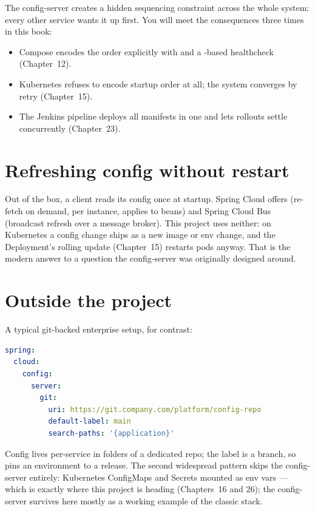 The config-server creates a hidden sequencing constraint across the whole
system: every other service wants it up first. You will meet the
consequences three times in this book:

\begin{itemize}
  \item Compose encodes the order explicitly with  and a
  -based healthcheck (Chapter~12).
  \item Kubernetes refuses to encode startup order at all; the system
  converges by retry (Chapter~15).
  \item The Jenkins pipeline deploys all manifests in one
   and lets rollouts settle concurrently
  (Chapter~23).
\end{itemize}

\section{Refreshing config without restart}

Out of the box, a client reads its config once at startup. Spring Cloud
offers  (re-fetch on demand, per instance,
applies to  beans) and Spring Cloud Bus (broadcast
refresh over a message broker). This project uses neither: on Kubernetes
a config change ships as a new image or env change, and the Deployment's
rolling update (Chapter~15) restarts pods anyway. That is the modern
answer to a question the config-server was originally designed around.

\section{Outside the project}

A typical git-backed enterprise setup, for contrast:

\begin{lstlisting}[language=yaml]
spring:
  cloud:
    config:
      server:
        git:
          uri: https://git.company.com/platform/config-repo
          default-label: main
          search-paths: '{application}'
\end{lstlisting}

Config lives per-service in folders of a dedicated repo; the label is a
branch, so  pins an environment to a
release. The second widespread pattern skips the config-server entirely:
Kubernetes ConfigMaps and Secrets mounted as env vars --- which is
exactly where this project is heading (Chapters~16 and 26); the
config-server survives here mostly as a working example of the classic
stack.

